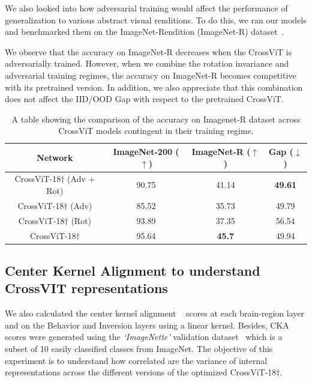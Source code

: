 \documentclass{article} %
\newcommand{\BlueM}{\textcolor{BlueModel}}
\newcommand{\GreenM}{\textcolor{GreenModel}}
\newcommand{\PinkM}{\textcolor{PinkModel}}
\newcommand{\OrangeM}{\textcolor{OrangeModel}}
\begin{document}
We also looked into how adversarial training would affect the performance of generalization to various abstract visual renditions. To do this, we ran our models and benchmarked them on the ImageNet-Rendition (ImageNet-R) dataset~\citep{hendrycks2021many}.

We observe that the accuracy on ImageNet-R decreases when the CrossViT is adversarially trained. However, when we combine the rotation invariance and adversarial training regimes, the accuracy on ImageNet-R becomes competitive with its pretrained version. In addition, we also appreciate that this combination does not affect the IID/OOD Gap with respect to the pretrained CrossViT.


\begin{table}[h!]
  \centering
    \begin{tabular}{c|c|c|c}
    Network & ImageNet-200 ($\uparrow$) & ImageNet-R ($\uparrow$) & Gap ($\downarrow$)\\\midrule
    \BlueM{CrossViT-18$\dagger$ (Adv + Rot)} & 90.75 & 41.14 & \textbf{49.61} \\\midrule
    \GreenM{CrossViT-18$\dagger$ (Adv)} & 85.52 & 35.73 & 49.79\\\midrule
    \PinkM{CrossViT-18$\dagger$ (Rot)}& 93.89 &  37.35 & 56.54\\\midrule
     \OrangeM{CrossViT-18$\dagger$} & 95.64 & \textbf{45.7} & 49.94
    \end{tabular}
  \vspace{4pt}
  \caption{A table showing the comparison of the accuracy on Imagenet-R dataset across CrossViT models contingent in their training regime.}
  \label{table:R}
\end{table}


\subsection{Center Kernel Alignment to understand CrossVIT representations}
We also calculated the center kernel alignment ~\citep{pmlr-v97-kornblith19a} scores at each brain-region layer and on the Behavior and Inversion layers using a linear kernel. Besides, CKA scores were generated using the \textit{`ImageNette'} validation dataset~\citep{imagewang} which is a subset of 10 easily classified classes from ImageNet. The objective of this experiment is to understand how correlated are the variance of internal representations across the different versions of the optimized CrossViT-18$\dagger$.
\end{document}
